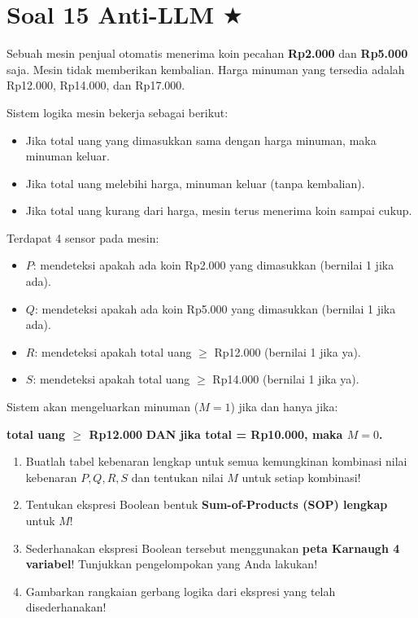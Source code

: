 \documentclass[12pt,a4paper]{article}
\begin{document}
\section*{Soal 15 Anti-LLM $\boldsymbol{\bigstar}$}

Sebuah mesin penjual otomatis menerima koin pecahan \textbf{Rp2.000} dan \textbf{Rp5.000} saja. Mesin tidak memberikan kembalian. Harga minuman yang tersedia adalah Rp12.000, Rp14.000, dan Rp17.000.

Sistem logika mesin bekerja sebagai berikut:
\begin{itemize}
    \item Jika total uang yang dimasukkan sama dengan harga minuman, maka minuman keluar.
    \item Jika total uang melebihi harga, minuman keluar (tanpa kembalian).
    \item Jika total uang kurang dari harga, mesin terus menerima koin sampai cukup.
\end{itemize}

Terdapat 4 sensor pada mesin:
\begin{itemize}
    \item $P$: mendeteksi apakah ada koin Rp2.000 yang dimasukkan (bernilai 1 jika ada).
    \item $Q$: mendeteksi apakah ada koin Rp5.000 yang dimasukkan (bernilai 1 jika ada).
    \item $R$: mendeteksi apakah total uang $\ge$ Rp12.000 (bernilai 1 jika ya).
    \item $S$: mendeteksi apakah total uang $\ge$ Rp14.000 (bernilai 1 jika ya).
\end{itemize}

Sistem akan mengeluarkan minuman ($M = 1$) jika dan hanya jika:
\begin{center}
\textbf{total uang $\ge$ Rp12.000} \qquad \textbf{DAN} \qquad \textbf{jika total = Rp10.000, maka $M=0$.}
\end{center}
\begin{enumerate}[label=(\alph*)]
    \item Buatlah tabel kebenaran lengkap untuk semua kemungkinan kombinasi nilai kebenaran $P, Q, R, S$ dan tentukan nilai $M$ untuk setiap kombinasi!
    \item Tentukan ekspresi Boolean bentuk \textbf{Sum-of-Products (SOP) lengkap} untuk $M$!
    \item Sederhanakan ekspresi Boolean tersebut menggunakan \textbf{peta Karnaugh 4 variabel}! Tunjukkan pengelompokan yang Anda lakukan!
    \item Gambarkan rangkaian gerbang logika dari ekspresi yang telah disederhanakan!
\end{enumerate}
\end{document}

